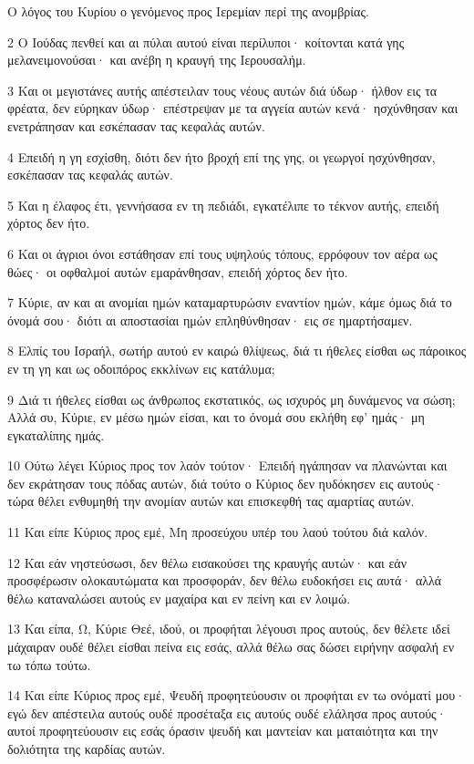 \par Ο λόγος του Κυρίου ο γενόμενος προς Ιερεμίαν περί της ανομβρίας.
\par 2 Ο Ιούδας πενθεί και αι πύλαι αυτού είναι περίλυποι· κοίτονται κατά γης μελανειμονούσαι· και ανέβη η κραυγή της Ιερουσαλήμ.
\par 3 Και οι μεγιστάνες αυτής απέστειλαν τους νέους αυτών διά ύδωρ· ήλθον εις τα φρέατα, δεν εύρηκαν ύδωρ· επέστρεψαν με τα αγγεία αυτών κενά· ησχύνθησαν και ενετράπησαν και εσκέπασαν τας κεφαλάς αυτών.
\par 4 Επειδή η γη εσχίσθη, διότι δεν ήτο βροχή επί της γης, οι γεωργοί ησχύνθησαν, εσκέπασαν τας κεφαλάς αυτών.
\par 5 Και η έλαφος έτι, γεννήσασα εν τη πεδιάδι, εγκατέλιπε το τέκνον αυτής, επειδή χόρτος δεν ήτο.
\par 6 Και οι άγριοι όνοι εστάθησαν επί τους υψηλούς τόπους, ερρόφουν τον αέρα ως θώες· οι οφθαλμοί αυτών εμαράνθησαν, επειδή χόρτος δεν ήτο.
\par 7 Κύριε, αν και αι ανομίαι ημών καταμαρτυρώσιν εναντίον ημών, κάμε όμως διά το όνομά σου· διότι αι αποστασίαι ημών επληθύνθησαν· εις σε ημαρτήσαμεν.
\par 8 Ελπίς του Ισραήλ, σωτήρ αυτού εν καιρώ θλίψεως, διά τι ήθελες είσθαι ως πάροικος εν τη γη και ως οδοιπόρος εκκλίνων εις κατάλυμα;
\par 9 Διά τι ήθελες είσθαι ως άνθρωπος εκστατικός, ως ισχυρός μη δυνάμενος να σώση; Αλλά συ, Κύριε, εν μέσω ημών είσαι, και το όνομά σου εκλήθη εφ' ημάς· μη εγκαταλίπης ημάς.
\par 10 Ούτω λέγει Κύριος προς τον λαόν τούτον· Επειδή ηγάπησαν να πλανώνται και δεν εκράτησαν τους πόδας αυτών, διά τούτο ο Κύριος δεν ηυδόκησεν εις αυτούς· τώρα θέλει ενθυμηθή την ανομίαν αυτών και επισκεφθή τας αμαρτίας αυτών.
\par 11 Και είπε Κύριος προς εμέ, Μη προσεύχου υπέρ του λαού τούτου διά καλόν.
\par 12 Και εάν νηστεύσωσι, δεν θέλω εισακούσει της κραυγής αυτών· και εάν προσφέρωσιν ολοκαυτώματα και προσφοράν, δεν θέλω ευδοκήσει εις αυτά· αλλά θέλω καταναλώσει αυτούς εν μαχαίρα και εν πείνη και εν λοιμώ.
\par 13 Και είπα, Ω, Κύριε Θεέ, ιδού, οι προφήται λέγουσι προς αυτούς, δεν θέλετε ιδεί μάχαιραν ουδέ θέλει είσθαι πείνα εις εσάς, αλλά θέλω σας δώσει ειρήνην ασφαλή εν τω τόπω τούτω.
\par 14 Και είπε Κύριος προς εμέ, Ψευδή προφητεύουσιν οι προφήται εν τω ονόματί μου· εγώ δεν απέστειλα αυτούς ουδέ προσέταξα εις αυτούς ουδέ ελάλησα προς αυτούς· αυτοί προφητεύουσιν εις εσάς όρασιν ψευδή και μαντείαν και ματαιότητα και την δολιότητα της καρδίας αυτών.
